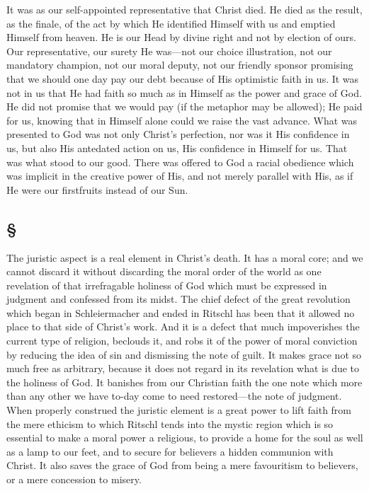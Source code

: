 \documentclass[draft]{ptfdoc}
\begin{document}
It was as our self-appointed representative 
that Christ died. He died as the result, as the 
finale, of the act by which He identified Himself 
with us and emptied Himself from heaven. He 
is our Head by divine right and not by election of 
ours. Our representative, our surety He was---not 
our choice illustration, not our mandatory 
champion, not our moral deputy, not our friendly 
sponsor promising that we should one day pay 
our debt because of His optimistic faith in us. 
It was not in us that He had faith so much as in 
Himself as the power and grace of God. He did 
not promise that we would pay (if the metaphor 
may be allowed); He paid for us, knowing that in 
Himself alone could we raise the vast advance. 
What was presented to God was not only 
Christ's perfection, nor was it His confidence in 
us, but also His antedated action on us, His confidence 
in Himself for us. That was what stood 
to our good. There was offered to God a racial 
obedience which was implicit in the creative 
power of His, and not merely parallel with His, 
as if He were our firstfruits instead of our Sun. 

\subsection*{
\S
}

The juristic aspect is a real element in Christ's 
death. It has a moral core; and we cannot 
discard it without discarding the moral order of 
the world as one revelation of that irrefragable 
holiness of God which must be expressed in 
judgment and confessed from its midst. The 
chief defect of the great revolution which began 
in Schleiermacher and ended in Ritschl has 
been that it allowed no place to that side of 
Christ's work. And it is a defect that much 
impoverishes the current type of religion, beclouds 
it, and robs it of the power of moral conviction 
by reducing the idea of sin and dismissing 
the note of guilt. It makes grace not so much 
free as arbitrary, because it does not regard in 
its revelation what is due to the holiness of God. 
It banishes from our Christian faith the one 
note which more than any other we have to-day 
come to need restored---the note of judgment. 
When properly construed the juristic element is 
a great power to lift faith from the mere 
ethicism to which Ritschl tends into the mystic 
region which is so essential to make a moral 
power a religious, to provide a home for the 
soul as well as a lamp to our feet, and to secure 
for believers a hidden communion with Christ. 
It also saves the grace of God from being a 
mere favouritism to believers, or a mere concession 
to misery. 
\end{document}
